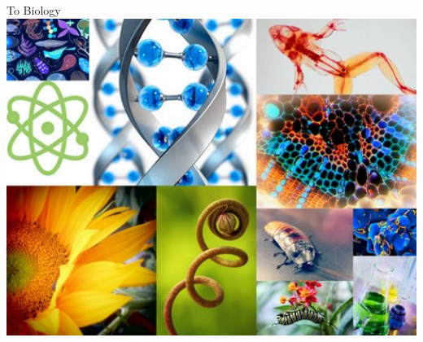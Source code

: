 \documentclass[10pt]{beamer}
\begin{document}
\begin{frame}[t]
\begin{columns}[T]
		\begin{column}{0.5\textwidth}
			\begin{center}
				To Biology\\
				\vspace{0.25cm}
				\includegraphics[width=1.0\textwidth]{figures/biology.jpg}
			\end{center}
		\end{column}
	\end{columns}	
\end{frame}
\end{document}
